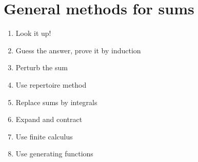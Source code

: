 \section{General methods for sums}
\begin{enumerate}
  \item Look it up!
  \item Guess the answer, prove it by induction
  \item Perturb the sum
  \item Use repertoire method
  \item Replace sums by integrals
  \item Expand and contract
  \item Use finite calculus
  \item Use generating functions
\end{enumerate}
